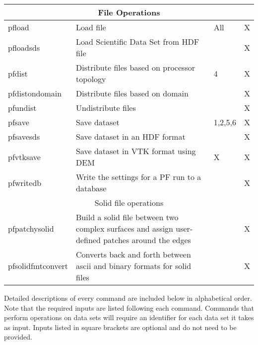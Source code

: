 {\begin{table}
\begin{tabular}{ | p{3cm} | p{6cm} | p{2cm} | p{3cm} | }
	\multicolumn{4}{|c|}{File Operations}  \\ \hline
	pfload & Load file & All & X \\ \hline
	pfloadsds & Load Scientific Data Set from HDF file &  & X \\ \hline
	pfdist & Distribute files  based on processor topology & 4 & X \\ \hline
	pfdistondomain & Distribute files based on domain &  & X \\ \hline
	pfundist & Undistribute files &  & X  \\ \hline
	pfsave & Save dataset & 1,2,5,6 & X \\ \hline
	pfsavesds & Save dataset in an HDF format &  & X \\ \hline
	pfvtksave & Save dataset in VTK format using DEM & X & X \\ \hline
	pfwritedb & Write the settings for a PF run to a database &  & X  \\ \hline
	\multicolumn{4}{|c|}{Solid file operations} \\ \hline
	pfpatchysolid & Build a solid file between two complex surfaces and assign user-defined patches around the edges &  & X \\ \hline
	pfsolidfmtconvert & Converts back and forth between ascii and binary formats for solid files &  & X  \\ \hline
\end{tabular}
\label{pftools3}
\end{table}
}
\clearpage

Detailed descriptions of every command are included below in alphabetical order.
Note that the required inputs are listed following each command. Commands that perform
operations on data sets will require an identifier for each data set it takes as input.
Inputs listed in square brackets are optional and do not need to be provided.

